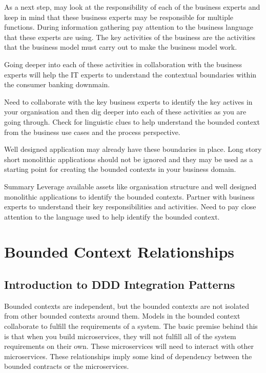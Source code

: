 \documentclass[a4paper, 11pt]{book}
\begin{document}
    As a next step, may look at the responsibility of each of the business experts and keep in mind that these business experts may be responsible for multiple functions.
    During information gathering pay attention to the business language that these experts are using.
    The key activities of the business are the activities that the business model must carry out to make the business model work.

    Going deeper into each of these activities in collaboration with the business experts will help the IT experts to understand the contextual boundaries within the consumer banking downmain.

    Need to collaborate with the key business experts to identify the key actives in your organisation and then dig deeper into each of these activities as you are going through.
    Check for linguistic clues to help understand the bounded context from the business use cases and the process perspective.

    Well designed application may already have these boundaries in place.
    Long story short monolithic applications should not be ignored and they may be used as a starting point for creating the bounded contexts in your business domain.

    Summary
    Leverage available assets like organisation structure and well designed monolithic applications to identify the bounded contexts.
    Partner with business experts to understand their key responsibilities and activities.
    Need to pay close attention to the language used to help identify the bounded context.


    \chapter{Bounded Context Relationships}


    \section{Introduction to DDD Integration Patterns}
    Bounded contexts are independent, but the bounded contexts are not isolated from other bounded contexts around them.
    Models in the bounded context collaborate to fulfill the requirements of a system.
    The basic premise behind this is that when you build microservices, they will not fulfill all of the system requirements on their own.
    These microservices will need to interact with other microservices.
    These relationships imply some kind of dependency between the bounded contracts or the microservices.
\end{document}
